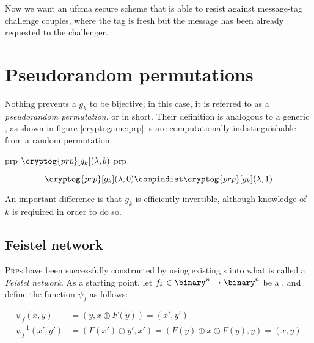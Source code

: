 Now we want an ufcma secure scheme that is able to resist against message-tag challenge couples, where the tag is fresh but the message has been already requested to the challenger.

\section{Pseudorandom permutations}

Nothing prevents a \prf{} $g_k$ to be bijective; in this case, it is referred to as a \emph{pseudorandom permutation}, or \prp{} in short. Their definition is analogous to a generic \prf, as shown in figure \ref{cryptogame:prp}: \prp{}s are computationally indistinguishable from a random permutation.

\begin{cryptogame}
    {prp}
    {$\cryptog{prp}[g_k](\lambda, b)$}
    {prp}


    \cseqdelay
    \cseqbeginloop
    \cseqendloop
    \cseqdelay

    
\end{cryptogame}

\[
    \cryptog{prp}[g_k](\lambda, 0) \compindist \cryptog{prp}[g_k](\lambda, 1)
\]

An important difference is that $g_k$ is efficiently invertible, although knowledge of $k$ is reqiuired in order to do so.

\subsection{Feistel network}

\textsc{Prp}s have been successfully constructed by using existing \prf{}s into what is called a \emph{Feistel network}. As a starting point, let $f_k \in \binary^n \to \binary^n$ be a \prf, and define the function $\psi_f$ as follows:

\begin{align*}
    \psi_f(x, y)        &= (y, x \oplus F(y)) = (x', y')                                  \\
    \psi^{-1}_f(x', y') &= (F(x') \oplus y', x') = (F(y) \oplus x \oplus F(y), y) = (x, y)    \\
\end{align*}


